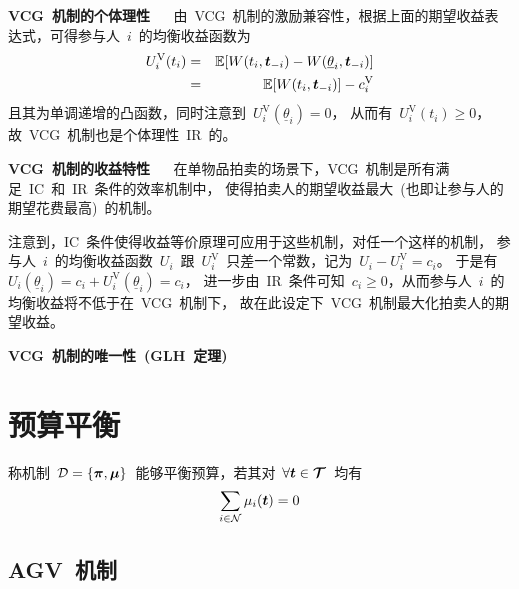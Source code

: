 \documentclass[a4paper,12pt]{article}
\newcommand{\mv}[1]{\mbox{\boldmath$#1$}}         %
\begin{document}
\textbf{VCG~机制的个体理性}~ ~
由~VCG~机制的激励兼容性，根据上面的期望收益表达式，可得参与人~$i$~的均衡收益函数为
\begin{eqnarray}
    \nonumber
    U_i^\mathrm{V}(t_i) &=& \mathbb{E}[W(t_i,\mv{t}_{-i}) - W(\underline{\theta}_i,\mv{t}_{-i})] \\
                        &=& \mathbb{E}[W(t_i,\mv{t}_{-i})] - c_i^\mathrm{V} \label{VCG_payoff_equ}
\end{eqnarray}
且其为单调递增的凸函数，同时注意到~$U_i^\mathrm{V}(\underline{\theta}_i)=0$，
从而有~$U_i^\mathrm{V}(t_i)\ge0$，故~VCG~机制也是个体理性~IR~的。

\textbf{VCG~机制的收益特性}~ ~
在单物品拍卖的场景下，VCG~机制是所有满足~IC~和~IR~条件的效率机制中，
使得拍卖人的期望收益最大~(也即让参与人的期望花费最高)~的机制。

注意到，IC~条件使得收益等价原理可应用于这些机制，对任一个这样的机制，
参与人~$i$~的均衡收益函数~$U_i$~跟~$U_i^\mathrm{V}$~只差一个常数，记为~$U_i - U_i^\mathrm{V} = c_i$。
于是有~$U_i(\underline{\theta}_i) = c_i + U_i^\mathrm{V}(\underline{\theta}_i) = c_i$，
进一步由~IR~条件可知~$c_i\ge0$，从而参与人~$i$~的均衡收益将不低于在~VCG~机制下，
故在此设定下~VCG~机制最大化拍卖人的期望收益。

\textbf{VCG~机制的唯一性~(GLH~定理)}~ ~





\section{预算平衡} 

称机制~$\mathcal{D} = \{\mv{\pi}, \mv{\mu}\}$~能够平衡预算，若其对~$\forall \mv{t}\in\mv{\mathcal{T}}$~均有
\begin{equation}
    \sum_{i\in\mathcal{N}} \mu_i(\mv{t}) = 0
\end{equation}

\subsection{AGV~机制}
\end{document}
